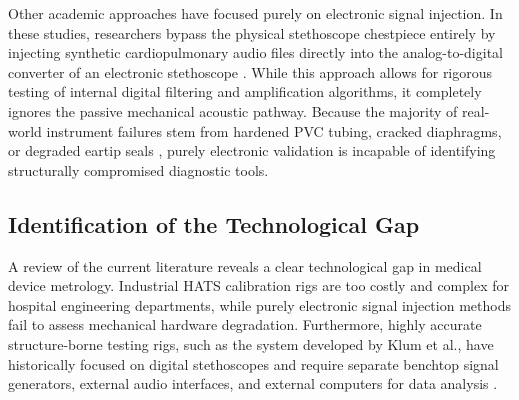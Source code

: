 Other academic approaches have focused purely on electronic signal injection. In these studies, researchers bypass the physical stethoscope chestpiece entirely by injecting synthetic cardiopulmonary audio files directly into the analog-to-digital converter of an electronic stethoscope \cite{leng2015electronic}. While this approach allows for rigorous testing of internal digital filtering and amplification algorithms, it completely ignores the passive mechanical acoustic pathway. Because the majority of real-world instrument failures stem from hardened PVC tubing, cracked diaphragms, or degraded eartip seals \cite{ertel1966stethoscope, leng2015electronic}, purely electronic validation is incapable of identifying structurally compromised diagnostic tools.

\subsection{Identification of the Technological Gap}

A review of the current literature reveals a clear technological gap in medical device metrology. Industrial HATS calibration rigs are too costly and complex for hospital engineering departments, while purely electronic signal injection methods fail to assess mechanical hardware degradation. Furthermore, highly accurate structure-borne testing rigs, such as the system developed by Klum et al., have historically focused on digital stethoscopes and require separate benchtop signal generators, external audio interfaces, and external computers for data analysis \cite{klum2019validation}.